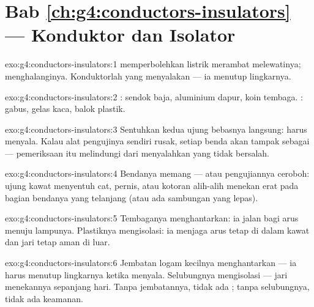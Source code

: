\section*{Bab \ref{ch:g4:conductors-insulators} --- Konduktor dan Isolator}

\begin{solution}{exo:g4:conductors-insulators:1}
 memperbolehkan listrik merambat melewatinya; 
menghalanginya. Konduktorlah yang menyalakan  --- ia menutup
lingkarnya.
\end{solution}

\begin{solution}{exo:g4:conductors-insulators:2}
: sendok baja, aluminium dapur, koin tembaga. :
gabus, gelas kaca, balok plastik.
\end{solution}

\begin{solution}{exo:g4:conductors-insulators:3}
Sentuhkan kedua ujung bebasnya langsung:  harus menyala.
Kalau alat pengujinya sendiri rusak, setiap benda akan tampak sebagai
 --- pemeriksaan itu melindungi dari menyalahkan yang tidak
bersalah.
\end{solution}

\begin{solution}{exo:g4:conductors-insulators:4}
Bendanya memang  --- atau pengujiannya ceroboh: ujung kawat
menyentuh cat, pernis, atau kotoran alih-alih menekan erat pada bagian
bendanya yang telanjang (atau ada sambungan yang lepas).
\end{solution}

\begin{solution}{exo:g4:conductors-insulators:5}
Tembaganya menghantarkan: ia jalan bagi arus menuju lampunya.
Plastiknya mengisolasi: ia menjaga arus tetap di dalam kawat dan jari
tetap aman di luar.
\end{solution}

\begin{solution}{exo:g4:conductors-insulators:6}
Jembatan logam kecilnya menghantarkan --- ia harus menutup
lingkarnya ketika  menyala. Selubungnya mengisolasi ---
jari menekannya sepanjang hari. Tanpa jembatannya, tidak ada ; tanpa
selubungnya, tidak ada keamanan.
\end{solution}

